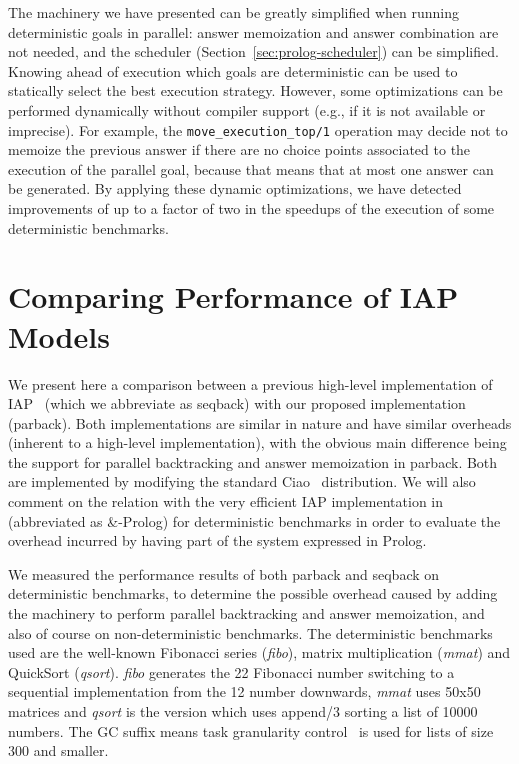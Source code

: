 \documentclass{tlp}
\newcounter{mnotei} \setcounter{mnotei}{0}
\newcommand{\mnote}[1]{{\scriptsize\textsf{\textcolor{blue}{}}}\marginpar{\scriptsize\textsf{\textcolor{red}{n.\themnotei: #1}}}\stepcounter{mnotei} }
\renewcommand{\mnote}[1]{}
\newcommand{\compressection}{\vspace{-1em}}
\begin{document}
The machinery we have presented can be greatly simplified when running
deterministic goals in parallel: answer memoization and answer
combination are not needed, and the scheduler
(Section~\ref{sec:prolog-scheduler}) can be simplified.
Knowing ahead of execution which goals are deterministic can be used
to statically select the best execution strategy.
However, some optimizations can be performed dynamically without
compiler support (e.g., if it is not available or imprecise).
For example, the \lstinline{move_execution_top/1} operation may decide
not to memoize the previous answer if there are no choice points
associated to the execution of the parallel goal, because that means
that at most one answer can be generated.\mnote{MCL: any other?}
By applying these dynamic optimizations, we have detected improvements
of up to a factor of two in the speedups of the execution of some
deterministic benchmarks.



\compressection
\section{Comparing Performance of IAP Models}
\label{sec:benchmarks}

We present here a comparison between a previous high-level
implementation of IAP~\cite{hlfullandpar-iclp2008} (which we
abbreviate as \textsf{seqback}) with our proposed implementation
(\textsf{parback}).  Both implementations are similar in nature and
have similar overheads (inherent to a high-level implementation), with
the obvious main difference being the support for parallel
backtracking and answer memoization in \textsf{parback}.
Both are implemented by modifying the standard
Ciao~\cite{ciao-reference-manual-1.13-short,hermenegildo11:ciao-design-tplp}
distribution. 
We will also comment on the relation with the very efficient IAP
implementation in~\cite{ngc-and-prolog} (abbreviated as
\textsf{\&-Prolog}) for deterministic benchmarks in order to evaluate
the overhead incurred by having part of the system expressed in
Prolog. 

We measured the performance results of both \textsf{parback} and
\textsf{seqback} on deterministic benchmarks, to determine the possible
overhead caused by adding the machinery to perform parallel
backtracking and answer memoization, and also of course on
non-deterministic benchmarks. 
The deterministic benchmarks used are the well-known Fibonacci series
(\emph{fibo}), matrix multiplication (\emph{mmat}) and QuickSort
(\emph{qsort}).
\emph{fibo} generates the 22 Fibonacci number
switching to a sequential implementation from the 12
number downwards, \emph{mmat} uses 50x50 matrices and \emph{qsort} is
the version which uses \textsf{append/3} sorting a list of 10000
numbers.  The GC suffix means task granularity
control~\cite{granularity-jsc} is used for lists of size 300 and
smaller.
 
\end{document}
